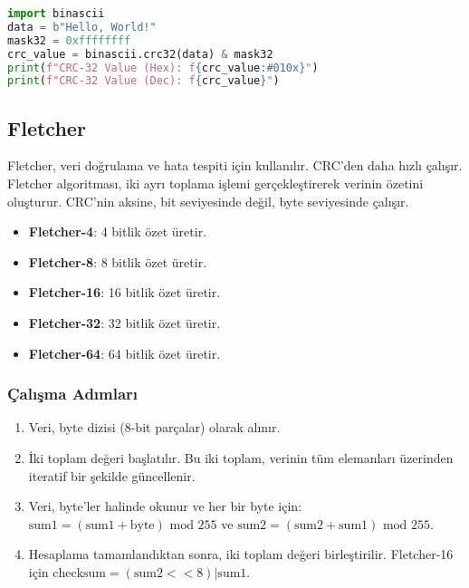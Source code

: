 \begin{lstlisting}[language=Python]
import binascii
data = b"Hello, World!"
mask32 = 0xffffffff
crc_value = binascii.crc32(data) & mask32
print(f"CRC-32 Value (Hex): f{crc_value:#010x}")
print(f"CRC-32 Value (Dec): f{crc_value}")
\end{lstlisting}

\newpage

\subsection{Fletcher}

Fletcher, veri doğrulama ve hata tespiti için kullanılır. CRC'den daha hızlı çalışır. Fletcher algoritması, iki ayrı toplama işlemi gerçekleştirerek verinin özetini oluşturur. CRC'nin aksine, bit seviyesinde değil, byte seviyesinde çalışır. 

\begin{itemize}
    \item \textbf{Fletcher-4}: 4 bitlik özet üretir.
    \item \textbf{Fletcher-8}: 8 bitlik özet üretir.
    \item \textbf{Fletcher-16}: 16 bitlik özet üretir. 
    \item \textbf{Fletcher-32}: 32 bitlik özet üretir.
    \item \textbf{Fletcher-64}: 64 bitlik özet üretir.
\end{itemize}

\subsubsection{Çalışma Adımları}

\begin{enumerate}
    \item Veri, byte dizisi (8-bit parçalar) olarak alınır.
    \item İki toplam değeri başlatılır. Bu iki toplam, verinin tüm elemanları üzerinden iteratif bir şekilde güncellenir.
    \item Veri, byte'ler halinde okunur ve her bir byte için: $\text{sum1} = (\text{sum1} + \text{byte}) \text{ mod } 255$ ve $\text{sum2} = (\text{sum2} + \text{sum1}) \text{ mod } 255$.
    \item Hesaplama tamamlandıktan sonra, iki toplam değeri birleştirilir. Fletcher-16 için $\text{checksum} = (\text{sum2} << 8) | \text{sum1}$.
\end{enumerate}

